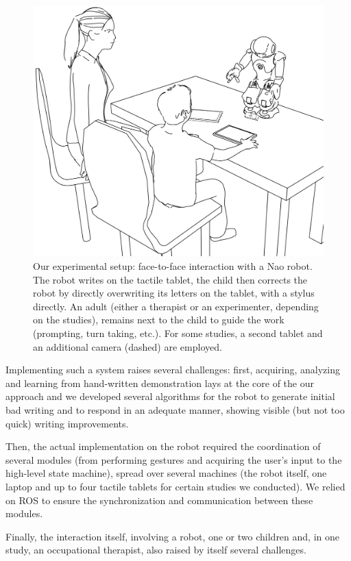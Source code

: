 \documentclass{article}
\begin{document}
\begin{figure}
    \centering
    \includegraphics[width=0.8\linewidth]{experimental_setup}
    \caption{Our experimental setup: face-to-face interaction with a Nao robot.
    The robot writes on the tactile tablet, the child then corrects the robot by
    directly overwriting its letters on the tablet, with a stylus directly. An adult
    (either a therapist or an experimenter, depending on the studies), remains next
    to the child to guide the work (prompting, turn taking, etc.). For some studies, a second tablet and an additional camera (dashed) are employed.}
    \label{experimental_setup}
\end{figure}

Implementing such a system raises several challenges: first, acquiring,
analyzing and learning from hand-written demonstration lays at the core of the
our approach and we developed several algorithms for the robot to generate
initial bad writing and to respond in an adequate manner, showing visible (but
not too quick) writing improvements.

Then, the actual implementation on the robot required the coordination of
several modules (from performing gestures and acquiring the user's input to
the high-level state machine), spread over several machines (the robot itself,
one laptop and up to four tactile tablets for certain studies we conducted). We
relied on ROS to ensure the synchronization and communication between these
modules.

Finally, the interaction itself, involving a robot, one or two children and, in
one study, an occupational therapist, also raised by itself several challenges.
\end{document}
